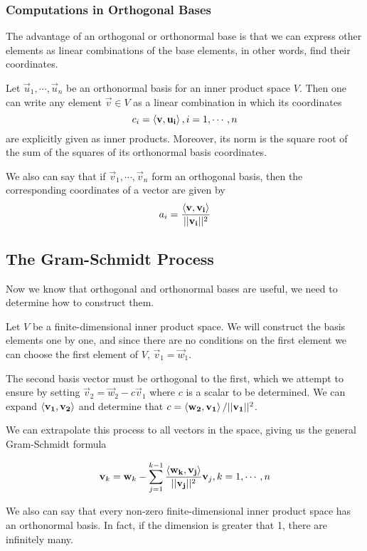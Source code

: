         \subsubsection{Computations in Orthogonal Bases}
        The advantage of an orthogonal or orthonormal base is that we can express other elements as linear combinations of the base elements, in other words, find their coordinates.
        \begin{thm}
            Let $\vec{u}_1, \cdots, \vec{u}_n$ be an orthonormal basis for an inner product space $V$. Then one can write any element $\vec{v} \in V$ as a linear combination in which its coordinates
                \[ c_i = \left\langle \mathbf{v}, \mathbf{u_i} \right\rangle, i=1, \cdots, n \]
            are explicitly given as inner products. Moreover, its norm is the square root of the sum of the squares of its orthonormal basis coordinates.

            We also can say that if $\vec{v}_1, \cdots, \vec{v}_n$ form an orthogonal basis, then the corresponding coordinates of a vector are given by
                \[ a_i = \frac{\left\langle \mathbf{v}, \mathbf{v_i} \right\rangle }{\lvert \lvert \mathbf{v_i} \rvert \rvert^2} \]
        \end{thm}

    \subsection{The Gram-Schmidt Process}
    Now we know that orthogonal and orthonormal bases are useful, we need to determine how to construct them.

    Let $V$ be a finite-dimensional inner product space. We will construct the basis elements one by one, and since there are no conditions on the first element we can choose the first element of $V$, $\vec{v}_1 = \vec{w}_1$.

    The second basis vector must be orthogonal to the first, which we attempt to ensure by setting $\vec{v}_2 = \vec{w}_2 - c \vec{v}_1$ where $c$ is a scalar to be determined. We can expand $\left\langle \mathbf{v_1}, \mathbf{v_2} \right\rangle$ and determine that $c = \left\langle \mathbf{w_2}, \mathbf{v_1} \right\rangle / \lvert \lvert \mathbf{v_1} \rvert \rvert^2$.

    We can extrapolate this process to all vectors in the space, giving us the general Gram-Schmidt formula

        \[ \mathbf{v}_k = \mathbf{w}_k - \sum^{k - 1}_{j = 1} \frac{\left\langle \mathbf{w_k}, \mathbf{v_j} \right\rangle }{\lvert \lvert \mathbf{v_j} \rvert \rvert^2} \mathbf{v}_j, k = 1, \cdots, n \]

    We also can say that every non-zero finite-dimensional inner product space has an orthonormal basis. In fact, if the dimension is greater that 1, there are infinitely many.


